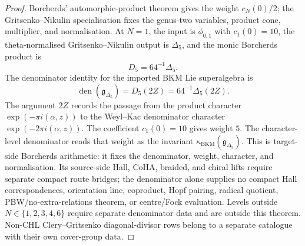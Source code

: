 \documentclass[11pt]{amsart}
\theoremstyle{definition}
\theoremstyle{remark}
\begin{document}
\begin{proof}
Borcherds' automorphic-product theorem gives the weight \(c_N(0)/2\);
the Gritsenko--Nikulin specialisation fixes the genus-two variables,
product cone, multiplier, and normalisation. At \(N=1\),
the input is \(\phi_{0,1}\) with \(c_1(0)=10\), the theta-normalised
Gritsenko--Nikulin output is \(\Delta_5\), and the monic Borcherds
product is
\[
        D_5=64^{-1}\Delta_5 .
\]
The denominator identity for the imported BKM Lie superalgebra is
\[
        \operatorname{den}(\mathfrak g_{\Delta_5})
        =D_5(2Z)=64^{-1}\Delta_5(2Z).
\]
The argument \(2Z\) records the passage from the product character
\(\exp(-\pi i(\alpha,z))\) to the Weyl--Kac denominator character
\(\exp(-2\pi i(\alpha,z))\).
The coefficient \(c_1(0)=10\) gives weight \(5\). The character-level
denominator reads that weight as the invariant
\(\kappa_{\mathrm{BKM}}(\mathfrak g_{\Delta_5})\). This is target-side
Borcherds arithmetic: it
fixes the denominator, weight, character, and normalisation. Its source-side
Hall, CoHA, braided, and chiral lifts require separate compact route
bridges; the denominator alone supplies no compact Hall correspondences,
orientation line, coproduct, Hopf pairing, radical quotient,
PBW/no-extra-relations theorem, or centre/Fock evaluation.
Levels outside \(N\in\{1,2,3,4,6\}\) require separate denominator data and
are outside this theorem. Non-CHL Clery--Gritsenko diagonal-divisor rows
belong to a separate catalogue with their own cover-group data.
\end{proof}
\end{document}
